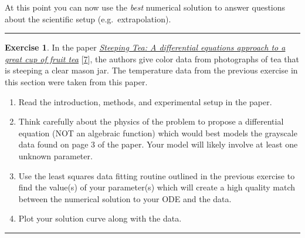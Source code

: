 \documentclass[
]{book}
\providecommand{\tightlist}{%
  \setlength{\itemsep}{0pt}\setlength{\parskip}{0pt}}
\theoremstyle{definition}
\theoremstyle{definition}
\theoremstyle{definition}
\newtheorem{exercise}{Exercise}[chapter]
\theoremstyle{remark}
\begin{document}
At this point you can now use the \emph{best} numerical solution to answer questions about the scientific setup (e.g.~extrapolation).

\begin{center}\rule{0.5\linewidth}{0.5pt}\end{center}

\begin{exercise}
\protect\hypertarget{exr:unnamed-chunk-485}{}{\label{exr:unnamed-chunk-485} }In the paper \href{https://www.simiode.org/resources/4192/download/1-094-S-SteepingTea-StudentVersion.pdf}{\emph{Steeping Tea: A differential equations approach to a great cup of fruit tea}} {[}\protect\hyperlink{ref-tea}{7}{]}, the authors give color data from photographs of tea that is steeping a clear mason jar. The temperature data from the previous exercise in this section were taken from this paper.

\begin{enumerate}
\def\labelenumi{\alph{enumi}.}
\tightlist
\item
  Read the introduction, methods, and experimental setup in the paper.
\item
  Think carefully about the physics of the problem to propose a differential equation (NOT an algebraic function) which would best models the grayscale data found on page 3 of the paper. Your model will likely involve at least one unknown parameter.
\item
  Use the least squares data fitting routine outlined in the previous exercise to find the value(s) of your parameter(s) which will create a high quality match between the numerical solution to your ODE and the data.
\item
  Plot your solution curve along with the data.
\end{enumerate}
\end{exercise}

\begin{center}\rule{0.5\linewidth}{0.5pt}\end{center}
\end{document}
